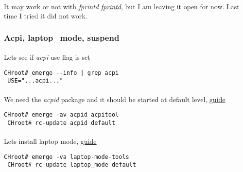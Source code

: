 \documentclass[10pt,a4paper]{article}
\begin{document}
                    \paragraph{} It may work or not with \textit{fprintd} \href{https://wiki.gentoo.org/wiki/Fingerprint_Reader}{\textit{fprintd}}, but I am leaving it open for now. Last time I tried it did not work.
                
                
                \newpage
                \subsubsection{Acpi, laptop\_mode, suspend}
                
                    \paragraph{} Lets see if \textit{acpi} use flag is set
                    
                    \begin{lstlisting}[style=BashInputCHRoot]
 CHroot# emerge --info | grep acpi
 USE="...acpi..."
                    \end{lstlisting}
                    
                    \paragraph{} We need the \textit{acpid} package and it should be started at default level, \href{https://wiki.gentoo.org/wiki/ACPI#Emerge}{guide}
                    
                    \begin{lstlisting}[style=BashInputCHRoot]
 CHroot# emerge -av acpid acpitool
 CHroot# rc-update acpid default                    
                    \end{lstlisting}
                    
                    \paragraph{} Lets install laptop mode, \href{https://wiki.gentoo.org/wiki/Power\_management/Guide#Installation}{guide}
                    
                    \begin{lstlisting}[style=BashInputCHRoot]
 CHroot# emerge -va laptop-mode-tools
 CHroot# rc-update laptop_mode default                    
                    \end{lstlisting}
                    
\end{document}
